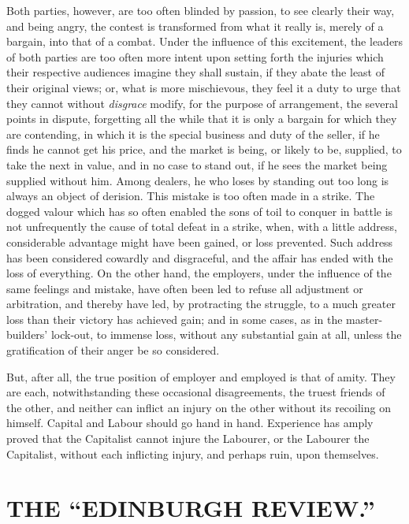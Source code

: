 Both parties, however, are too often blinded by passion, to see clearly
their way, and being angry, the contest is transformed from what it
really is, merely of a bargain, into that of a combat. Under the
influence of this excitement, the leaders of both parties are too often
more intent upon setting forth the injuries which their respective
audiences imagine they shall sustain, if they abate the least of their
original views; or, what is more mischievous, they feel it a duty to
urge that they cannot without \textit{disgrace} modify, for the purpose
of arrangement, the several points in dispute, forgetting all the while
that it is only a bargain for which they are contending, in which it is
the special business and duty of the seller, if he finds he cannot get
his price, and the market is being, or likely to be, supplied, to take
the next in value, and in no case to stand out, if he sees the market
being supplied without him. Among dealers, he who loses by standing out
too long is always an object of derision. This mistake is too often made
in a strike. The dogged valour which has so often enabled the sons of
toil to conquer in battle is not unfrequently the cause of total defeat
in a strike, when, with a little address, considerable advantage might
have been gained, or loss prevented. Such address has been considered
cowardly and disgraceful, and the affair has ended with the loss of
everything. On the other hand, the employers, under the influence of the
same feelings and mistake, have often been led to refuse all adjustment
or arbitration, and thereby have led, by protracting the struggle, to a
much greater loss than their victory has achieved gain; and in some
cases, as in the master-builders' lock-out, to immense loss, without any
substantial gain at all, unless the gratification of their anger be so
considered.

But, after all, the true position of employer and employed is that of
amity. They are each, notwithstanding these occasional disagreements,
the truest friends of the other, and neither can inflict an injury on
the other without its recoiling on himself. Capital and Labour should go
hand in hand. Experience has amply proved that the Capitalist cannot
injure the Labourer, or the Labourer the Capitalist, without each
inflicting injury, and perhaps ruin, upon themselves.

\section{THE ``EDINBURGH REVIEW.''}

